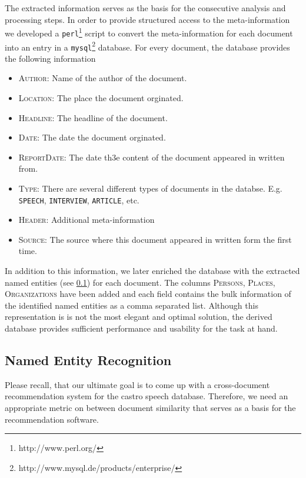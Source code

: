 The extracted information serves as the basis for the consecutive analysis and processing steps. In
order to provide structured access to the meta-information we developed a
\texttt{perl}\footnote{http://www.perl.org/} script to convert the meta-information for each
document into an entry in a \texttt{mysql}\footnote{http://www.mysql.de/products/enterprise/}
database. For every document, the database provides the following information
\begin{itemize}
 \item{\textsc{Author:} Name of the author of the document.}
 \item{\textsc{Location:} The place the document orginated.}
 \item{\textsc{Headline:} The headline of the document.}
 \item{\textsc{Date:} The date the document orginated.}
 \item{\textsc{ReportDate:} The date th3e content of the document appeared in written from.}
 \item{\textsc{Type:} There are several different types of documents in the databse. E.g.
 \texttt{SPEECH}, \texttt{INTERVIEW}, \texttt{ARTICLE}, etc.}
 \item{\textsc{Header:} Additional meta-information}
 \item{\textsc{Source:} The source where this document appeared in written form the first time.}
\end{itemize}
In addition to this information, we later enriched the database with the extracted named entities
(see \ref{sec:named_entity_recognition}) for each document. The columns \textsc{Persons},
\textsc{Places}, \textsc{Organizations} have been added and each field contains the bulk information
of the identified named entities as a comma separated list. Although this representation is is not
the most elegant and optimal solution, the derived database provides sufficient performance and
usability for the task at hand.

\subsection{Named Entity Recognition}
\label{sec:named_entity_recognition}
Please recall, that our ultimate goal is to come up with a cross-document recommendation system for
the castro speech database. Therefore, we need an appropriate metric on between document
similarity that serves as a basis for the recommendation software.

